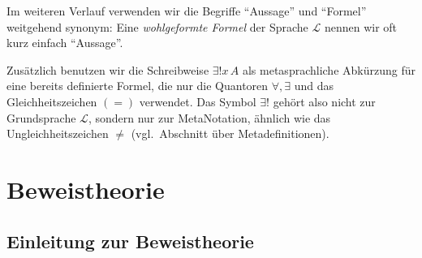 \documentclass[main.tex]{subfiles}
\begin{document}
\begin{remark}
Im weiteren Verlauf verwenden wir die Begriffe \enquote{Aussage}
und \enquote{Formel} weitgehend synonym: Eine \emph{wohlgeformte
Formel} der Sprache \(\mathcal L\) nennen wir oft kurz einfach
\enquote{Aussage}.

Zusätzlich benutzen wir die Schreibweise \(\exists!x\,A\) als
metasprachliche Abkürzung für eine bereits definierte Formel, die
nur die Quantoren \(\forall,\exists\) und das Gleichheitszeichen
\((=)\) verwendet. Das Symbol \(\exists!\) gehört also nicht zur
Grundsprache \(\mathcal L\), sondern nur zur Meta\-Notation, ähnlich
wie das Ungleichheitszeichen \(\neq\) (vgl.\ Abschnitt über
Metadefinitionen).
\end{remark}


\chapter{Beweistheorie}

\section{Einleitung zur Beweistheorie}
\end{document}
